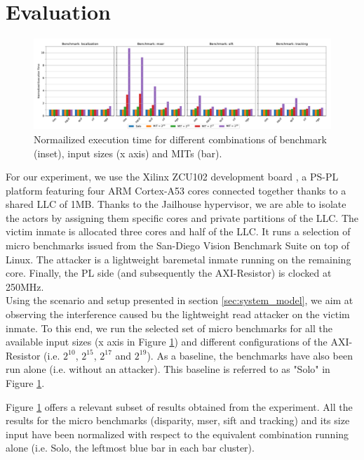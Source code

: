 \section{Evaluation}
    \label{sec:evaluation}
    \begin{figure}
        \centering
        \includegraphics[scale=0.425]{images/cpu-brainfreeze-interference.pdf}
        \caption{Normailized execution time for different combinations of benchmark (inset), input sizes (x axis) and MITs (bar).}
        \label{fig:cpu-brainfreeze-interference-results}
    \end{figure}

    For our experiment, we use the Xilinx ZCU102 development board \cite{Xilinx-ULTRASCALE-TRM}, a PS-PL platform featuring four ARM Cortex-A53 cores \cite{ARM-cortex-A53} connected together thanks to a shared LLC of 1MB.
    Thanks to the Jailhouse hypervisor, we are able to isolate the actors by assigning them specific cores and private partitions of the LLC.
    The victim inmate is allocated three cores and half of the LLC.
    It runs a selection of micro benchmarks issued from the San-Diego Vision Benchmark Suite \cite{SD-VBS} on top of Linux.
    The attacker is a lightweight baremetal inmate running on the remaining core.
    Finally, the PL side (and subsequently the AXI-Resistor) is clocked at 250MHz.\\

    Using the scenario and setup presented in section \ref{sec:system_model}, we aim at observing the interference caused bu the lightweight read attacker on the victim inmate.
    To this end, we run the selected set of micro benchmarks for all the available input sizes (x axis in Figure \ref{fig:cpu-brainfreeze-interference-results}) and different configurations of the AXI-Resistor (i.e. $2^{10}$, $2^{15}$, $2^{17}$ and $2^{19}$).
    As a baseline, the benchmarks have also been run alone (i.e. without an attacker).
    This baseline is referred to as "Solo" in Figure \ref{fig:cpu-brainfreeze-interference-results}.

    Figure \ref{fig:cpu-brainfreeze-interference-results} offers a relevant subset of results obtained from the experiment.
    All the results for the micro benchmarks (disparity, mser, sift and tracking) and its size input have been normalized with respect to the equivalent combination running alone (i.e. Solo, the leftmost blue bar in each bar cluster).

